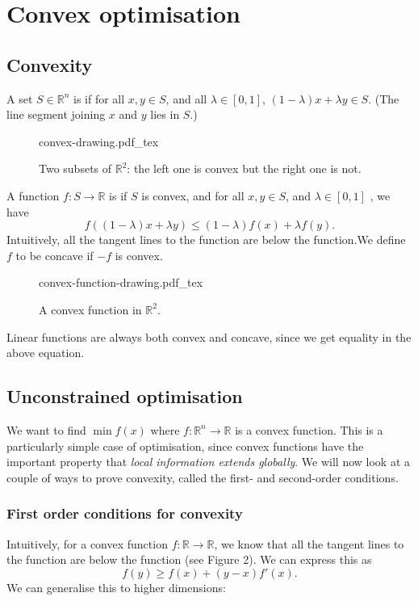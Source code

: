 \documentclass[a4paper]{scrartcl}
\newcommand{\incfig}[2]{%
    \def\svgwidth{#1mm}
    {#2.pdf_tex}
}
\begin{document}
\section{Convex optimisation} 
\subsection{Convexity}
\begin{definition}
	 A set $S \in \mathbb{R}^{n} $ is  if for all $x,y \in S$, and all $\lambda \in [0,1]$, $(1-\lambda)x+\lambda y \in S$. (The line segment joining $x$ and $y$ lies in $S$.)  
	 \begin{figure}[H]
		\centering
		\incfig{70}{convex-drawing}
		\caption{Two subsets of $\mathbb{R}^{2} $: the left one is convex but the right one is not.}
	\end{figure}
\end{definition}
\newpage 

\begin{definition}
	 A function $f:S \rightarrow \mathbb{R}$ is  if $S$ is convex, and for all $x,y \in S$, and $\lambda \in [0,1]$ , we have 
	 \[f((1-\lambda)x+\lambda y)\leq (1-\lambda)f(x)+ \lambda f(y).\] 
	 Intuitively, all the tangent lines to the function are below the function.We define $f$ to be concave if $-f$ is convex.
	 \begin{figure}[H]
		\centering
		\incfig{70}{convex-function-drawing}
		\caption{A convex function in $\mathbb{R}^2$.}
	\end{figure}
\end{definition}
\begin{remark}
	Linear functions are always both convex and concave, since we get equality in the above equation.
\end{remark}

\subsection{Unconstrained optimisation}
We want to find $\min f(x)$ where $f: \mathbb{R}^{n} \rightarrow \mathbb{R}$ is a convex function. This is a particularly simple case of optimisation, since convex functions have the important property that \emph{local information extends globally}. We will now look at a couple of ways to prove convexity, called the first- and second-order conditions.

\subsubsection{First order conditions for convexity}
Intuitively, for a convex function $f:\mathbb{R} \rightarrow \mathbb{R}$, we know that all the tangent lines to the function are below the function (see Figure 2). We can express this as 
\[f(y) \geq f(x)+(y-x)f'(x).\]
We can generalise this to higher dimensions:
\end{document}
